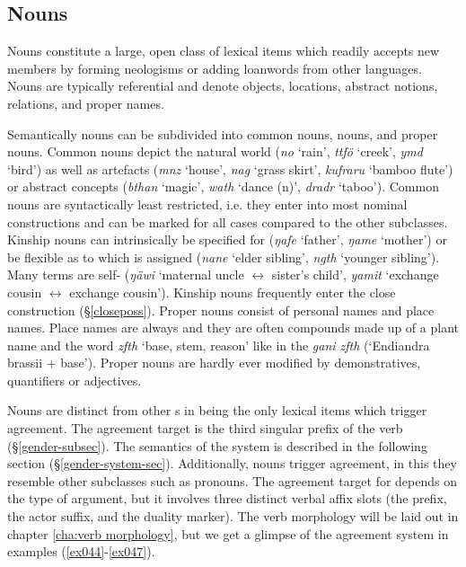 \subsection{Nouns} \label{nouns-sec}

Nouns constitute a large, open class of lexical items which readily accepts new members by forming neologisms or adding loanwords from other languages. Nouns are typically referential and denote objects, locations, abstract notions,  relations, and proper names.

Semantically nouns can be subdivided into common nouns,  nouns, and proper nouns. Common nouns depict the natural world (\emph{no} `rain', \emph{ttfö} `creek', \emph{ymd} `bird') as well as artefacts (\emph{mnz} `house', \emph{nag} `grass skirt', \emph{kufraru} `bamboo flute') or abstract concepts (\emph{bthan} `magic', \emph{wath} `dance (n)', \emph{dradr} `taboo'). Common nouns are syntactically least restricted, i.e. they enter into most nominal constructions and can be marked for all cases compared to the other  subclasses. Kinship nouns can intrinsically be specified for  (\emph{ŋafe} `father', \emph{ŋame} `mother') or be flexible as to which  is assigned (\emph{nane} `elder sibling', \emph{ngth} `younger sibling'). Many  terms are self- (\emph{ŋäwi} `maternal uncle $\leftrightarrow$ sister's child', \emph{yamit} `exchange cousin $\leftrightarrow$ exchange cousin'). Kinship nouns frequently enter the close  construction ({\S}\ref{closeposs}). Proper nouns consist of personal names and place names. Place names are always  and they are often compounds made up of a plant name and the word \emph{zfth} `base, stem, reason' like in the  \emph{gani zfth} (`Endiandra brassii + base'). Proper nouns are hardly ever modified by demonstratives, quantifiers or adjectives.

Nouns are distinct from other s in being the only lexical items which trigger  agreement. The agreement target is the third  singular prefix of the verb ({\S}\ref{gender-subsec}). The semantics of the  system is described in the following section ({\S}\ref{gender-system-sec}). Additionally, nouns trigger  agreement, in this they resemble other  subclasses such as pronouns. The agreement target for  depends on the type of argument, but it involves three distinct verbal affix slots (the  prefix, the actor suffix, and the duality marker). The verb morphology will be laid out in chapter \ref{cha:verb morphology}, but we get a glimpse of the agreement system in examples (\ref{ex044}-\ref{ex047}).

